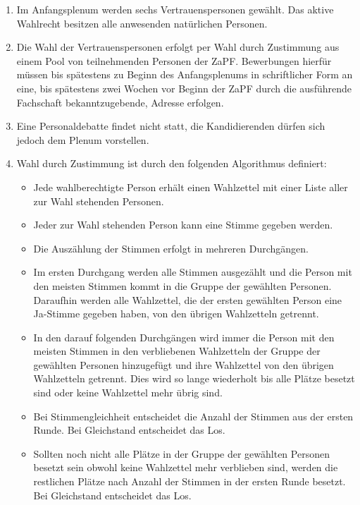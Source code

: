 \documentclass[12pt,oneside]{scrartcl}
\begin{document}
\begin{enumerate}
\item Im Anfangsplenum werden sechs Vertrauenspersonen gewählt. Das aktive
Wahlrecht besitzen alle anwesenden natürlichen Personen.

\item Die Wahl der Vertrauenspersonen erfolgt per Wahl durch
Zustimmung aus einem Pool von teilnehmenden Personen der ZaPF.
Bewerbungen hierfür müssen bis spätestens zu Beginn des Anfangsplenums
in schriftlicher Form an eine, bis spätestens zwei Wochen vor Beginn der
ZaPF durch die ausführende Fachschaft bekanntzugebende, Adresse erfolgen.

\item Eine Personaldebatte findet nicht statt, die Kandidierenden dürfen sich
jedoch dem Plenum vorstellen.

\item Wahl durch Zustimmung ist durch den folgenden Algorithmus definiert:

\begin{itemize}
\item Jede wahlberechtigte Person erhält einen Wahlzettel mit einer
Liste aller zur Wahl stehenden Personen.

\item Jeder zur Wahl stehenden Person kann eine Stimme gegeben werden.

\item Die Auszählung der Stimmen erfolgt in mehreren Durchgängen.

\item Im ersten Durchgang werden alle Stimmen ausgezählt und die Person
mit den meisten Stimmen kommt in die Gruppe der gewählten Personen.
Daraufhin werden alle Wahlzettel, die der ersten gewählten Person
eine Ja-Stimme gegeben haben, von den übrigen Wahlzetteln getrennt.

\item In den darauf folgenden Durchgängen wird immer die Person mit den
meisten Stimmen in den verbliebenen Wahlzetteln der Gruppe der gewählten
Personen hinzugefügt und ihre Wahlzettel von den übrigen Wahlzetteln
getrennt. Dies wird so lange wiederholt bis alle Plätze besetzt sind
oder keine Wahlzettel mehr übrig sind.

\item Bei Stimmengleichheit entscheidet die Anzahl der Stimmen aus der
ersten Runde. Bei Gleichstand entscheidet das Los.

\item Sollten noch nicht alle Plätze in der Gruppe der gewählten Personen
besetzt sein obwohl keine Wahlzettel mehr verblieben sind, werden
die restlichen Plätze nach Anzahl der Stimmen in der ersten Runde
besetzt. Bei Gleichstand entscheidet das Los.
\end{itemize}


\end{enumerate}
\end{document}
